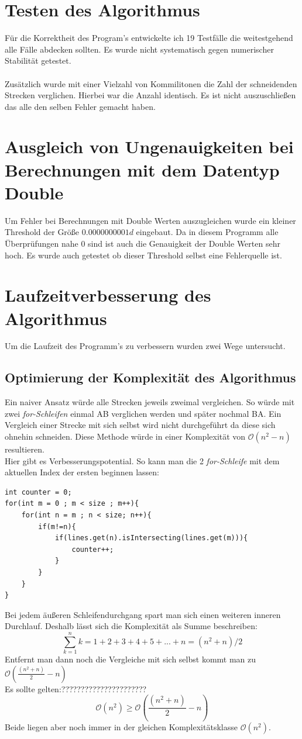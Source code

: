\documentclass[conference]{IEEEtran}
\begin{document}
\section{Testen des Algorithmus}
Für die Korrektheit des Program's entwickelte ich 19 Testfälle die weitestgehend alle Fälle abdecken sollten. Es wurde nicht systematisch gegen numerischer Stabilität getestet.\\
\\
Zusätzlich wurde mit einer Vielzahl von Kommilitonen die Zahl der schneidenden Strecken verglichen. Hierbei war die Anzahl identisch. Es ist nicht auszuschließen das alle den selben Fehler gemacht haben.

\section{Ausgleich von Ungenauigkeiten bei Berechnungen mit dem Datentyp Double}
Um Fehler bei Berechnungen mit Double Werten auszugleichen wurde ein kleiner Threshold der Größe $0.0000000001d$ eingebaut. Da in diesem Programm alle Überprüfungen nahe 0 sind ist auch die Genauigkeit der Double Werten sehr hoch. Es wurde auch getestet ob dieser Threshold selbst eine Fehlerquelle ist.

\section{Laufzeitverbesserung des Algorithmus}
Um die Laufzeit des Programm's zu verbessern wurden zwei Wege untersucht.
\subsection{Optimierung der Komplexität des Algorithmus}
Ein naiver Ansatz würde alle Strecken jeweils zweimal vergleichen. So würde mit zwei \textit{for-Schleifen} einmal AB verglichen werden und später nochmal BA. Ein Vergleich einer Strecke mit sich selbst wird nicht durchgeführt da diese sich ohnehin schneiden. Diese Methode würde in einer Komplexität von $\mathcal{O}(n^2-n)$ resultieren.\\
Hier gibt es Verbesserungspotential. So kann man die 2 \textit{for-Schleife} mit dem aktuellen Index der ersten beginnen lassen:
\begin{lstlisting}
int counter = 0;
for(int m = 0 ; m < size ; m++){
	for(int n = m ; n < size; n++){
		if(m!=n){
			if(lines.get(n).isIntersecting(lines.get(m))){
				counter++;
			}
		}
	}
}
\end{lstlisting}
Bei jedem äußeren Schleifendurchgang spart man sich einen weiteren inneren Durchlauf.
Deshalb lässt sich die Komplexität als Summe beschreiben:
\[ \sum_{k=1}^{n} k = 1+2+3+4+5+...+n = (n^2 + n) / 2 \]
Entfernt man dann noch die Vergleiche mit sich selbst kommt man zu $\mathcal{O}(\frac{(n^2 + n)}{2}-n)$\\
Es sollte gelten:??????????????????????
\[ \mathcal{O}(n^2) \geq \mathcal{O}(\frac{(n^2 + n)}{2}-n) \]
Beide liegen aber noch immer in der gleichen Komplexitätsklasse $\mathcal{O}(n^2)$.
\end{document}
